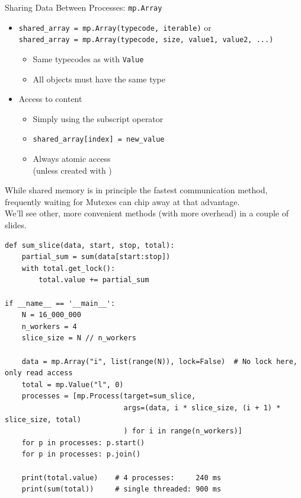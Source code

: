 \begin{frame}{Sharing Data Between Processes: \texttt{mp.Array}}
%
\begin{itemize}
\item \texttt{shared\_array = mp.Array(typecode, iterable)} or \\
	\texttt{shared\_array = mp.Array(typecode, size, value1, value2, ...)}
	\begin{itemize}
	\item Same typecodes as with \texttt{Value}
	\item All objects must have the same type
	\end{itemize}
\item Access to content
	\begin{itemize}
	\item Simply using the subscript operator
	\item \texttt{shared\_array[index] = new\_value}
	\item Always atomic access \\
		(unless created with )
	\end{itemize}
\end{itemize}
%
\begin{hintbox}[Speed]
\small
While shared memory is in principle the fastest communication method, frequently waiting for Mutexes can chip away at that advantage.\\
We'll see other, more convenient methods (with more overhead) in a couple of slides.
\end{hintbox}
%
\end{frame}


\begin{frame}[fragile]
%
\begin{codebox}
\begin{verbatim}
def sum_slice(data, start, stop, total):
    partial_sum = sum(data[start:stop])
    with total.get_lock():
        total.value += partial_sum

if __name__ == '__main__':
    N = 16_000_000
    n_workers = 4
    slice_size = N // n_workers
    
    data = mp.Array("i", list(range(N)), lock=False)  # No lock here, only read access
    total = mp.Value("l", 0)
    processes = [mp.Process(target=sum_slice,
                            args=(data, i * slice_size, (i + 1) * slice_size, total)
                            ) for i in range(n_workers)]
    for p in processes: p.start()
    for p in processes: p.join()
    
    print(total.value)    # 4 processes:     240 ms
    print(sum(total))     # single threaded: 900 ms
\end{verbatim}
\end{codebox}
%
\end{frame}

